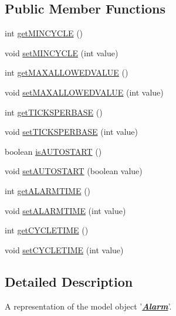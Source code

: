 \subsection*{Public Member Functions}
\begin{DoxyCompactItemize}
\item 
int \hyperlink{interfaceshootingmachineemfmodel_1_1_alarm_a0fbebe94ea5a08f4ad9bace4563bd149}{get\-M\-I\-N\-C\-Y\-C\-L\-E} ()
\item 
void \hyperlink{interfaceshootingmachineemfmodel_1_1_alarm_a7400566a915b403ceb7219ccd4a40f7c}{set\-M\-I\-N\-C\-Y\-C\-L\-E} (int value)
\item 
int \hyperlink{interfaceshootingmachineemfmodel_1_1_alarm_a63e36037c1877c380b5494f1a05dce5e}{get\-M\-A\-X\-A\-L\-L\-O\-W\-E\-D\-V\-A\-L\-U\-E} ()
\item 
void \hyperlink{interfaceshootingmachineemfmodel_1_1_alarm_aae7bb6babb30269f5a6e7c74db2a0471}{set\-M\-A\-X\-A\-L\-L\-O\-W\-E\-D\-V\-A\-L\-U\-E} (int value)
\item 
int \hyperlink{interfaceshootingmachineemfmodel_1_1_alarm_ada895bdbb794428a1f71ba70acaf7fa3}{get\-T\-I\-C\-K\-S\-P\-E\-R\-B\-A\-S\-E} ()
\item 
void \hyperlink{interfaceshootingmachineemfmodel_1_1_alarm_a1f9e751dd5f46578f54abd54aee555f8}{set\-T\-I\-C\-K\-S\-P\-E\-R\-B\-A\-S\-E} (int value)
\item 
boolean \hyperlink{interfaceshootingmachineemfmodel_1_1_alarm_a8c57a5583c781aa422d21e13be557d70}{is\-A\-U\-T\-O\-S\-T\-A\-R\-T} ()
\item 
void \hyperlink{interfaceshootingmachineemfmodel_1_1_alarm_a1f97de741bbb8ba21335c3c9db52721c}{set\-A\-U\-T\-O\-S\-T\-A\-R\-T} (boolean value)
\item 
int \hyperlink{interfaceshootingmachineemfmodel_1_1_alarm_a186180990a9c00307acdcd4d6dbf4c9e}{get\-A\-L\-A\-R\-M\-T\-I\-M\-E} ()
\item 
void \hyperlink{interfaceshootingmachineemfmodel_1_1_alarm_ad098d87bd6080719a7fa438f7d1ccb6f}{set\-A\-L\-A\-R\-M\-T\-I\-M\-E} (int value)
\item 
int \hyperlink{interfaceshootingmachineemfmodel_1_1_alarm_a11fdadcd243369f06f69c66230f1a831}{get\-C\-Y\-C\-L\-E\-T\-I\-M\-E} ()
\item 
void \hyperlink{interfaceshootingmachineemfmodel_1_1_alarm_a638312e8d84ee55345afe7f0883cdeb3}{set\-C\-Y\-C\-L\-E\-T\-I\-M\-E} (int value)
\end{DoxyCompactItemize}


\subsection{Detailed Description}
A representation of the model object '{\itshape {\bfseries \hyperlink{interfaceshootingmachineemfmodel_1_1_alarm}{Alarm}}}'.

